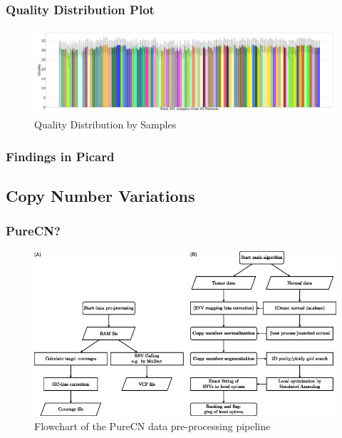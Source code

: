 \documentclass{beamer}
\begin{document}
    \begin{frame}
        \frametitle{Quality Distribution Plot}

        \begin{figure}
            \includegraphics[width=\linewidth]{figures/CollectMultipleMetrics/BWA.pdf}
            \caption{Quality Distribution by Samples}
        \end{figure}
    \end{frame}

    \begin{frame}
        \frametitle{Findings in Picard}
    \end{frame}

    \subsection{Copy Number Variations}
     \begin{frame}
        \frametitle{PureCN?}

        \begin{figure}
            \includegraphics[width=0.6 \linewidth]{figures/Workflow/pureCN.jpg}
            \caption{Flowchart of the PureCN data pre-processing pipeline \protect\cite{pureCN1}}
        \end{figure}
    \end{frame}
\end{document}
